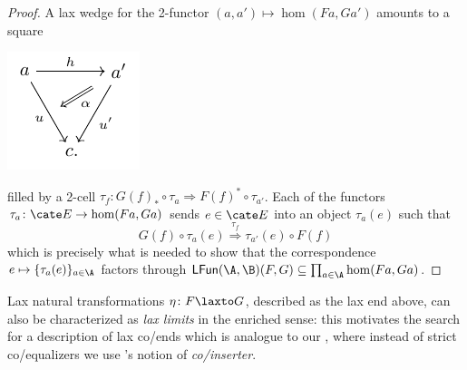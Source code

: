 \begin{proof}
A lax wedge for the 2-functor $(a,a')\mapsto \hom(Fa, Ga')$ amounts to a square
\begin{center}
\includegraphics[scale=1]{figures/fig20}
\end{center}
filled by a 2-cell $\tau_f\colon G(f)_* \circ \tau_a \Rightarrow F(f)^* \circ \tau_{a'}$. Each of the functors $\tau_a\colon \cate E\to \hom(Fa, Ga)$ sends $e\in \cate E$ into an object $\tau_a(e)$ such that
\[
G(f)\circ \tau_a(e) \overset{\tau_f}\Longrightarrow \tau_{a'}(e)\circ F(f)
\]
which is precisely what is needed to show that the correspondence $e\mapsto \{\tau_a(e)\}_{a\in \A}$ factors through $\textsf{LFun}(\A,\B)(F,G)\subseteq \prod_{a\in\A}\hom(Fa, Ga)$.
\end{proof}
Lax natural transformations $\eta\colon F\laxto G$, described as the lax end above, can also be characterized as \emph{lax limits} in the enriched sense: this motivates the search for a description of lax co/ends which is analogue to our , where instead of strict co/equalizers we use \cite{2catlimits}'s notion of \emph{co/inserter}.

